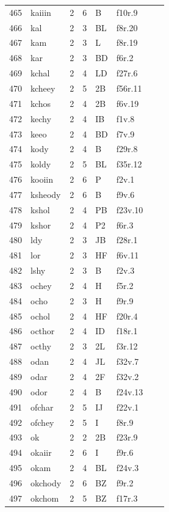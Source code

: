 \documentclass[11pt,a4paper]{article}
\begin{document}
\begin{landscape}
\begin{longtable}{@{}r>{\ttfamily}lrrl>{\ttfamily}l>{\raggedright\arraybackslash}p{80mm}>{\raggedright\arraybackslash}p{36mm}@{}}
465 & kaiiin & 2 & 6 & B & f10r.9 &  & \\
466 & kal & 2 & 3 & BL & f8r.20 &  & \\
467 & kam & 2 & 3 & L & f8r.19 &  & \\
468 & kar & 2 & 3 & BD & f6r.2 &  & \\
469 & kchal & 2 & 4 & LD & f27r.6 &  & \\
470 & kcheey & 2 & 5 & 2B & f56r.11 &  & \\
471 & kchos & 2 & 4 & 2B & f6v.19 &  & \\
472 & kechy & 2 & 4 & IB & f1v.8 &  & \\
473 & keeo & 2 & 4 & BD & f7v.9 &  & \\
474 & kody & 2 & 4 & B & f29r.8 &  & \\
475 & koldy & 2 & 5 & BL & f35r.12 &  & \\
476 & kooiin & 2 & 6 & P & f2v.1 &  & \\
477 & ksheody & 2 & 6 & B & f9v.6 &  & \\
478 & kshol & 2 & 4 & PB & f23v.10 &  & \\
479 & kshor & 2 & 4 & P2 & f6r.3 &  & \\
480 & ldy & 2 & 3 & JB & f28r.1 &  & \\
481 & lor & 2 & 3 & HF & f6v.11 &  & \\
482 & lshy & 2 & 3 & B & f2v.3 &  & \\
483 & ochey & 2 & 4 & H & f5r.2 &  & \\
484 & ocho & 2 & 3 & H & f9r.9 &  & \\
485 & ochol & 2 & 4 & HF & f20r.4 &  & \\
486 & octhor & 2 & 4 & ID & f18r.1 &  & \\
487 & octhy & 2 & 3 & 2L & f3r.12 &  & \\
488 & odan & 2 & 4 & JL & f32v.7 &  & \\
489 & odar & 2 & 4 & 2F & f32v.2 &  & \\
490 & odor & 2 & 4 & B & f24v.13 &  & \\
491 & ofchar & 2 & 5 & IJ & f22v.1 &  & \\
492 & ofchey & 2 & 5 & I & f8r.9 &  & \\
493 & ok & 2 & 2 & 2B & f23r.9 &  & \\
494 & okaiir & 2 & 6 & I & f9r.6 &  & \\
495 & okam & 2 & 4 & BL & f24v.3 &  & \\
496 & okchody & 2 & 6 & BZ & f9r.2 &  & \\
497 & okchom & 2 & 5 & BZ & f17r.3 &  & \\

\end{longtable}
\end{landscape}
\end{document}

